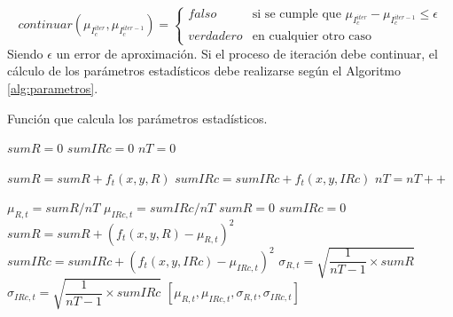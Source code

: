   \begin{equation}\label{ec:continuar}
  continuar(\mu_{I_{c}^{iter}},\mu_{I_{c}^{iter-1}}) = \begin{cases}
  falso & \text{si se cumple que } \mu_{I_{c}^{iter}} - \mu_{I_{c}^{iter-1}} \leq \epsilon \\
  verdadero & \text{en cualquier otro caso }
  \end{cases}
  \end{equation}
  Siendo $ \epsilon $ un error de aproximaci\'on. Si el proceso de iteraci\'on debe continuar, el c\'alculo  de los par\'ametros estad\'isticos debe realizarse seg\'un el Algoritmo \ref{alg:parametros}.
  \begin{algorithm}
  	\caption{Funci\'on que calcula los par\'ametros estad\'isticos.}
  	\label{alg:parametros}
  	\begin{algorithmic}[1]
  		\Statex
		\State $sumR =0$ 
		\State $sumIRc =0 $ 
		\State $nT =0 $ 
													
					\State $sumR=sumR+f_{t}(x,y,R)$
					\State $sumIRc=sumIRc+f_{t}(x,y,IRc)$
					\State $nT=nT++$
				\EndIf
			\EndFor
		\EndFor

		\State $ \mu_{R,t}= sumR/nT$
		\State $ \mu_{IRc,t}= sumIRc/nT$
		\State $ sumR=0$
		\State $ sumIRc=0$
					\State $sumR=sumR+(f_{t}(x,y,R)-\mu_{R,t})^{2}$
					\State $sumIRc=sumIRc+(f_{t}(x,y,IRc)-\mu_{IRc,t})^{2}$
				\EndIf
			\EndFor
		\EndFor
		\State $\sigma_{R,t}=\sqrt{\dfrac{1}{nT-1} \times sumR}$
		\State $\sigma_{IRc,t}=\sqrt{\dfrac{1}{nT-1} \times sumIRc}$
  		\Statex
  		\Return $[\mu_{R,t},\mu_{IRc,t},\sigma_{R,t},\sigma_{IRc,t}]$
  		\EndFunction
  	\end{algorithmic}
  \end{algorithm}
